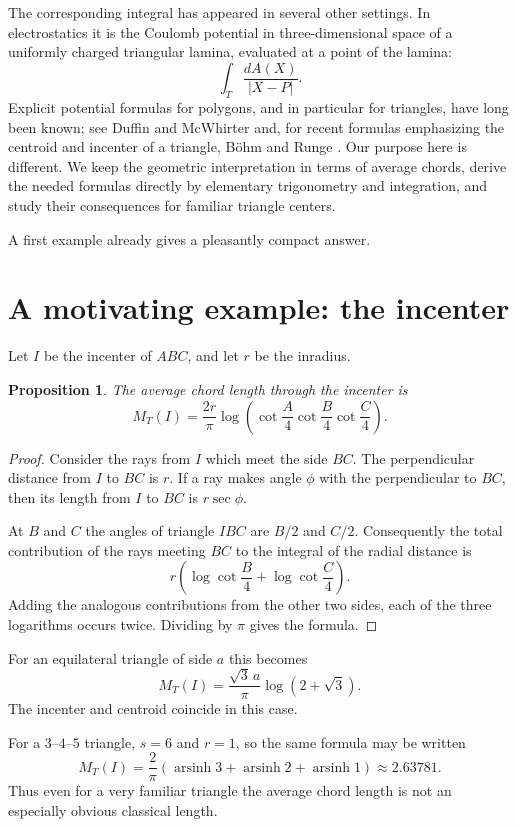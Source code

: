 \documentclass[11pt]{article}
\newtheorem{proposition}[theorem]{Proposition}
\theoremstyle{remark}
\newcommand{\arsinh}{\operatorname{arsinh}}
\begin{document}
The corresponding integral has appeared in several other settings.
In electrostatics it is the Coulomb potential in three-dimensional
space of a uniformly charged triangular lamina, evaluated at a point
of the lamina:
\[
 \int_T\frac{dA(X)}{|X-P|}.
\]
Explicit potential formulas for polygons, and in particular for
triangles, have long been known; see Duffin and McWhirter
\cite{DuffinMcWhirter} and, for recent formulas emphasizing the
centroid and incenter of a triangle, B\"ohm and Runge
\cite{BohmRunge}.  Our purpose here is different.  We keep the
geometric interpretation in terms of average chords, derive the
needed formulas directly by elementary trigonometry and integration,
and study their consequences for familiar triangle centers.

A first example already gives a pleasantly compact answer.

\section{A motivating example: the incenter}

Let $I$ be the incenter of $ABC$, and let $r$ be the inradius.

\begin{proposition}
The average chord length through the incenter is
\[
 {
 M_T(I)=\frac{2r}{\pi}
 \log\left(\cot\frac A4\cot\frac B4\cot\frac C4\right).
 }
\]
\end{proposition}

\begin{proof}
Consider the rays from $I$ which meet the side $BC$.  The perpendicular
distance from $I$ to $BC$ is $r$.  If a ray makes angle $\phi$ with
the perpendicular to $BC$, then its length from $I$ to $BC$ is
$r\sec\phi$.

At $B$ and $C$ the angles of triangle $IBC$ are $B/2$ and $C/2$.
Consequently the total contribution of the rays meeting $BC$ to the
integral of the radial distance is
\[
 r\left(\log\cot\frac B4+\log\cot\frac C4\right).
\]
Adding the analogous contributions from the other two sides, each of
the three logarithms occurs twice.  Dividing by $\pi$ gives the
formula.
\end{proof}

For an equilateral triangle of side $a$ this becomes
\[
 M_T(I)=
 \frac{\sqrt3\,a}{\pi}\log(2+\sqrt3).
\]
The incenter and centroid coincide in this case.

For a $3$--$4$--$5$ triangle, $s=6$ and $r=1$, so the same formula
may be written
\[
 M_T(I)
 =
 \frac{2}{\pi}
 \left(\arsinh 3+\arsinh 2+\arsinh 1\right)
 \approx 2.63781.
\]
Thus even for a very familiar triangle the average chord length is
not an especially obvious classical length.
\end{document}
